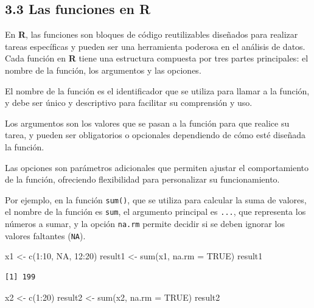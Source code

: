 \documentclass[
  letterpaper,
]{scrbook}
\newenvironment{Shaded}{\begin{snugshade}}{\end{snugshade}}
\newcommand{\AttributeTok}[1]{\textcolor[rgb]{0.40,0.45,0.13}{#1}}
\newcommand{\ConstantTok}[1]{\textcolor[rgb]{0.56,0.35,0.01}{#1}}
\newcommand{\DecValTok}[1]{\textcolor[rgb]{0.68,0.00,0.00}{#1}}
\newcommand{\FunctionTok}[1]{\textcolor[rgb]{0.28,0.35,0.67}{#1}}
\newcommand{\NormalTok}[1]{\textcolor[rgb]{0.00,0.23,0.31}{#1}}
\newcommand{\OtherTok}[1]{\textcolor[rgb]{0.00,0.23,0.31}{#1}}
\newcommand{\SpecialCharTok}[1]{\textcolor[rgb]{0.37,0.37,0.37}{#1}}
\begin{document}
\hypertarget{las-funciones-en-r}{%
\subsection{3.3 Las funciones en R}\label{las-funciones-en-r}}

En \textbf{R}, las funciones son bloques de código reutilizables
diseñados para realizar tareas específicas y pueden ser una herramienta
poderosa en el análisis de datos. Cada función en \textbf{R} tiene una
estructura compuesta por tres partes principales: el nombre de la
función, los argumentos y las opciones.

El nombre de la función es el identificador que se utiliza para llamar a
la función, y debe ser único y descriptivo para facilitar su comprensión
y uso.

Los argumentos son los valores que se pasan a la función para que
realice su tarea, y pueden ser obligatorios o opcionales dependiendo de
cómo esté diseñada la función.

Las opciones son parámetros adicionales que permiten ajustar el
comportamiento de la función, ofreciendo flexibilidad para personalizar
su funcionamiento.

Por ejemplo, en la función \texttt{sum()}, que se utiliza para calcular
la suma de valores, el nombre de la función es \texttt{sum}, el
argumento principal es \texttt{...}, que representa los números a sumar,
y la opción \texttt{na.rm} permite decidir si se deben ignorar los
valores faltantes (\texttt{NA}).

\begin{Shaded}
\begin{Highlighting}[]
\NormalTok{x1 }\OtherTok{\textless{}{-}} \FunctionTok{c}\NormalTok{(}\DecValTok{1}\SpecialCharTok{:}\DecValTok{10}\NormalTok{, }\ConstantTok{NA}\NormalTok{, }\DecValTok{12}\SpecialCharTok{:}\DecValTok{20}\NormalTok{)}
\NormalTok{result1 }\OtherTok{\textless{}{-}} \FunctionTok{sum}\NormalTok{(x1, }\AttributeTok{na.rm =} \ConstantTok{TRUE}\NormalTok{)}
\NormalTok{result1}
\end{Highlighting}
\end{Shaded}

\begin{verbatim}
[1] 199
\end{verbatim}

\begin{Shaded}
\begin{Highlighting}[]
\NormalTok{x2 }\OtherTok{\textless{}{-}} \FunctionTok{c}\NormalTok{(}\DecValTok{1}\SpecialCharTok{:}\DecValTok{20}\NormalTok{)}
\NormalTok{result2 }\OtherTok{\textless{}{-}} \FunctionTok{sum}\NormalTok{(x2, }\AttributeTok{na.rm =} \ConstantTok{TRUE}\NormalTok{)}
\NormalTok{result2}
\end{Highlighting}
\end{Shaded}
\end{document}
